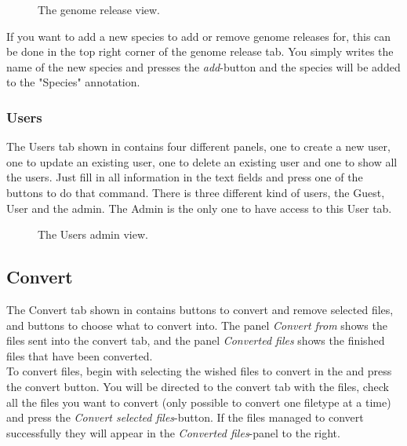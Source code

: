 \begin{figure}[h!]
\caption{The genome release view.}
\label{fig:adm_desktopGenomeTab}
\end{figure}

If you want to add a new species to add or remove genome releases for, this can be done in the top right corner of the genome release tab. You simply writes the name of the new species and presses the \textit{add}-button and the species will be added to the "Species" annotation.


\subsubsection{Users}

The Users tab shown in  contains four different panels, one to create a new user, one to update an existing user, one to delete an existing user and one to show all the users. Just fill in all information in the text fields and press one of the buttons to do that command. There is three different kind of users, the Guest, User and the admin. The Admin is the only one to have access to this User tab.


 \begin{figure}[h!]
 \caption{The Users admin view.}
 \label{fig:des_users}
 \end{figure}


\subsection{Convert}

The Convert tab shown in  contains buttons to convert and remove selected files, and buttons to choose what to convert into. The panel \textit{Convert from} shows the files sent into the convert tab, and the panel \textit{Converted files} shows the finished files that have been converted. \\

To convert files, begin with selecting the wished files to convert in the  and press the convert button. You will be directed to the convert tab with the files, check all the files you want to convert (only possible to convert one filetype at a time) and press the \textit{Convert selected files}-button. If the files managed to convert successfully they will appear in the \textit{Converted files}-panel  to the right. \\

